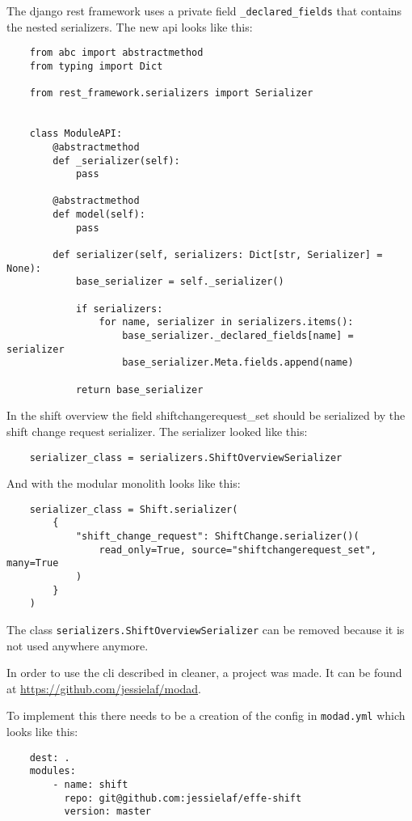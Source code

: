 The django rest framework uses a private field \texttt{\_declared\_fields} that contains the nested serializers. The new api looks like this:
\begin{verbatim}
    from abc import abstractmethod
    from typing import Dict

    from rest_framework.serializers import Serializer


    class ModuleAPI:
        @abstractmethod
        def _serializer(self):
            pass

        @abstractmethod
        def model(self):
            pass

        def serializer(self, serializers: Dict[str, Serializer] = None):
            base_serializer = self._serializer()

            if serializers:
                for name, serializer in serializers.items():
                    base_serializer._declared_fields[name] = serializer
                    base_serializer.Meta.fields.append(name)

            return base_serializer
\end{verbatim}

In the shift overview the field shiftchangerequest\_set should be serialized by the shift change request serializer. The serializer looked like this:
\begin{verbatim}
    serializer_class = serializers.ShiftOverviewSerializer
\end{verbatim}

And with the modular monolith looks like this:
\begin{verbatim}
    serializer_class = Shift.serializer(
        {
            "shift_change_request": ShiftChange.serializer()(
                read_only=True, source="shiftchangerequest_set", many=True
            )
        }
    )
\end{verbatim}

The class \texttt{serializers.ShiftOverviewSerializer} can be removed because it is not used anywhere anymore.

In order to use the cli described in  cleaner, a project was made. It can be found at \url{https://github.com/jessielaf/modad}.

To implement this there needs to be a creation of the config in \texttt{modad.yml} which looks like this:
\begin{verbatim}
    dest: .
    modules:
        - name: shift
          repo: git@github.com:jessielaf/effe-shift
          version: master
\end{verbatim}

